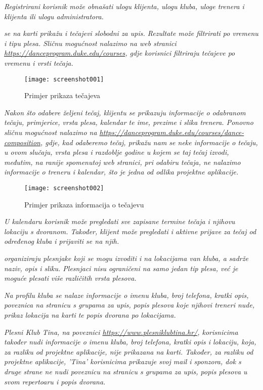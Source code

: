 \textit{Registrirani korisnik može obnašati ulogu klijenta, ulogu kluba, uloge trenera i klijenta ili ulogu administratora.}

\textit{ se na karti prikažu i tečajevi slobodni za upis. Rezultate može filtrirati po vremenu i tipu plesa. Sličnu mogućnost nalazimo na web stranici \url{https://danceprogram.duke.edu/courses}, gdje korisnici filtriraju tečajeve po vremenu i vrsti tečaja.}

\begin{figure}[H]
	\centering
	\texttt{[image: screenshot001]}
	\caption{Primjer prikaza tečajeva}
	\label{fig:screenshot001}
\end{figure}

\textit{Nakon što odabere željeni tečaj, klijentu se prikazuju informacije o odabranom tečaju, primjerice, vrsta plesa, kalendar te ime, prezime i slika trenera. Ponovno sličnu mogućnost nalazimo na \url{https://danceprogram.duke.edu/courses/dance-composition}, gdje, kad odaberemo tečaj, prikažu nam se neke informacije o tečaju, u ovom slučaju, vrsta plesa i razdoblje godine u kojem se taj tečaj izvodi, međutim, na ranije spomenutoj web stranici, pri odabiru tečaja, ne nalazimo informacije o treneru i kalendar, što je jedna od odlika projektne aplikacije.}

\begin{figure}[H]
	\centering
	\texttt{[image: screenshot002]}
	\caption{Primjer prikaza informacija o tečajevu}
	\label{fig:screenshot002}
\end{figure}

\textit{ U kalendaru korisnik može pregledati sve zapisane termine tečaja i njihovu lokaciju s dvoranom. Također, klijent može pregledati i aktivne prijave za tečaj od određenog kluba i prijaviti se na njih.}

\textit{ organiziraju plesnjake koji se mogu izvoditi i na lokacijama van kluba, a sadrže naziv, opis i sliku. Plesnjaci nisu ograničeni na samo jedan tip plesa, već je moguće plesati više različitih vrsta plesova.}

\textit{Na profilu kluba se nalaze informacije o imenu kluba, broj telefona, kratki opis, poveznica na stranicu s grupama za upis, popis plesova koje njihovi treneri nude, prikaz lokacija na karti te popis dvorana po lokacijama.}

\textit{Plesni Klub Tina, na poveznici \url{https://www.plesniklubtina.hr/}, korisnicima također nudi informacije o imenu kluba, broj telefona, kratki opis i lokaciju, koja, za razliku od projektne aplikacije, nije prikazana na karti. Također, za razliku od projektne aplikacije, 'Tina' korisnicima prikazuje svoj mail i sponzora, dok s druge strane ne nudi poveznicu na stranicu s grupama za upis, popis plesova u svom repertoaru i popis dvorana.}

